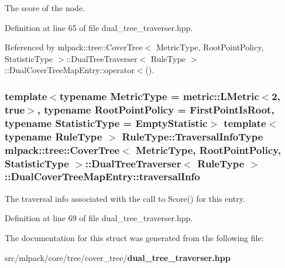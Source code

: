 The score of the node. 



Definition at line 65 of file dual\-\_\-tree\-\_\-traverser.\-hpp.



Referenced by mlpack\-::tree\-::\-Cover\-Tree$<$ Metric\-Type, Root\-Point\-Policy, Statistic\-Type $>$\-::\-Dual\-Tree\-Traverser$<$ Rule\-Type $>$\-::\-Dual\-Cover\-Tree\-Map\-Entry\-::operator$<$().

\subsubsection[{traversal\-Info}]{\setlength{\rightskip}{0pt plus 5cm}template$<$typename Metric\-Type  = metric\-::\-L\-Metric$<$2, true$>$, typename Root\-Point\-Policy  = First\-Point\-Is\-Root, typename Statistic\-Type  = Empty\-Statistic$>$ template$<$typename Rule\-Type $>$ Rule\-Type\-::\-Traversal\-Info\-Type {\bf mlpack\-::tree\-::\-Cover\-Tree}$<$ Metric\-Type, Root\-Point\-Policy, Statistic\-Type $>$\-::{\bf Dual\-Tree\-Traverser}$<$ Rule\-Type $>$\-::Dual\-Cover\-Tree\-Map\-Entry\-::traversal\-Info}\label{structmlpack_1_1tree_1_1CoverTree_1_1DualTreeTraverser_1_1DualCoverTreeMapEntry_a5db069cb9ce4581d65f84b4aa0874420}


The traversal info associated with the call to Score() for this entry. 



Definition at line 69 of file dual\-\_\-tree\-\_\-traverser.\-hpp.



The documentation for this struct was generated from the following file\-:\begin{DoxyCompactItemize}
\item 
src/mlpack/core/tree/cover\-\_\-tree/{\bf dual\-\_\-tree\-\_\-traverser.\-hpp}\end{DoxyCompactItemize}
